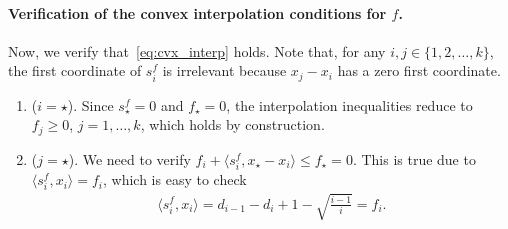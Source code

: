 \documentclass[a4paper]{article}
\renewcommand{\leq}{\leqslant}
\renewcommand{\geq}{\geqslant}
\newcommand{\ip}[2]{\langle #1, #2\rangle}
\begin{document}
\paragraph{Verification of the convex interpolation conditions for $f$.}
Now, we verify that~\eqref{eq:cvx_interp} holds.
Note that, for any $i,j\in\{1,2,\ldots,k\}$, the first coordinate of $s_i^f$ is irrelevant because $x_j-x_i$ has a zero first coordinate.

\begin{enumerate}[label=($f$.\roman{*})]
        \item (\(i=\star\)).
        Since \(s_\star^f=0\) and \(f_\star=0\), the interpolation inequalities reduce to
        $f_j\geq0$, $j=1,\ldots,k$,
        which holds by construction.
        \item (\(j=\star\)).
        We need to verify
        $f_i+\ip{s_i^f}{x_\star-x_i}\leq f_\star=0$. This is true due to  \(\ip{s_i^f}{x_i}=f_i\), which is easy to check
        \begin{align*}
          \ip{s_i^f}{x_i} = d_{i-1} - d_i + 1 - \sqrt{\frac{i-1}{i}} = f_i.
        \end{align*}
        

\end{enumerate}
\end{document}
